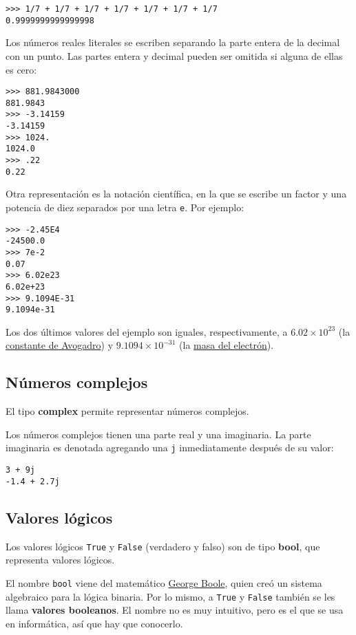 \begin{lstlisting}
>>> 1/7 + 1/7 + 1/7 + 1/7 + 1/7 + 1/7 + 1/7
0.9999999999999998
\end{lstlisting}

Los números reales literales se escriben separando la parte entera de la
decimal con un punto. Las partes entera y decimal pueden ser omitida si
alguna de ellas es cero:

\begin{lstlisting}
>>> 881.9843000
881.9843
>>> -3.14159
-3.14159
>>> 1024.
1024.0
>>> .22
0.22
\end{lstlisting}

Otra representación es la notación científica, en la que se escribe un
factor y una potencia de diez separados por una letra \lstinline!e!. Por
ejemplo:

\begin{lstlisting}
>>> -2.45E4
-24500.0
>>> 7e-2
0.07
>>> 6.02e23
6.02e+23
>>> 9.1094E-31
9.1094e-31
\end{lstlisting}

Los dos últimos valores del ejemplo son iguales, respectivamente, a
$6.02\times 10^{23}$ (la
\href{http://es.wikipedia.org/wiki/Constante\_de\_Avogadro}{constante de
Avogadro}) y $9.1094\times 10^{-31}$ (la
\href{http://es.wikipedia.org/wiki/Electr\%C3\%B3n\#Propiedades}{masa
del electrón}).

\subsection{Números complejos}

El tipo \textbf{complex} permite representar números complejos.

Los números complejos tienen una parte real y una imaginaria. La parte
imaginaria es denotada agregando una \lstinline!j! inmediatamente
después de su valor:

\begin{lstlisting}
3 + 9j
-1.4 + 2.7j
\end{lstlisting}

\subsection{Valores lógicos}

Los valores lógicos \lstinline!True! y \lstinline!False! (verdadero y
falso) son de tipo \textbf{bool}, que representa valores lógicos.

El nombre \lstinline!bool! viene del matemático
\href{http://es.wikipedia.org/wiki/George\_Boole}{George Boole}, quien
creó un sistema algebraico para la lógica binaria. Por lo mismo, a
\lstinline!True! y \lstinline!False! también se les llama
\textbf{valores booleanos}. El nombre no es muy intuitivo, pero es el
que se usa en informática, así que hay que conocerlo.

